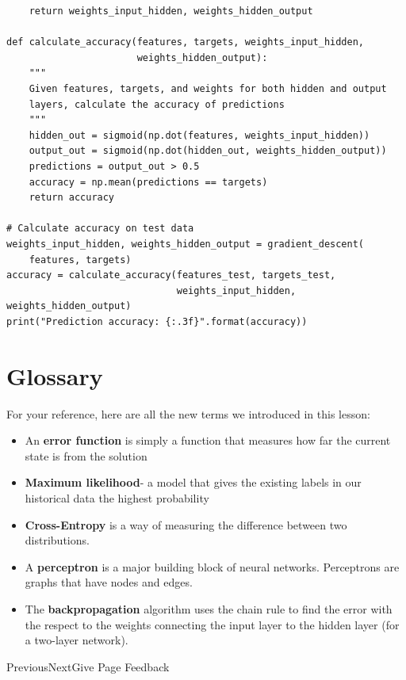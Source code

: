 \begin{lstlisting}
    return weights_input_hidden, weights_hidden_output

def calculate_accuracy(features, targets, weights_input_hidden,
                       weights_hidden_output):
    """
    Given features, targets, and weights for both hidden and output
    layers, calculate the accuracy of predictions
    """
    hidden_out = sigmoid(np.dot(features, weights_input_hidden))
    output_out = sigmoid(np.dot(hidden_out, weights_hidden_output))
    predictions = output_out > 0.5
    accuracy = np.mean(predictions == targets)
    return accuracy

# Calculate accuracy on test data
weights_input_hidden, weights_hidden_output = gradient_descent(
    features, targets)
accuracy = calculate_accuracy(features_test, targets_test,
                              weights_input_hidden, weights_hidden_output)
print("Prediction accuracy: {:.3f}".format(accuracy))
\end{lstlisting}

\section{Glossary}

For your reference, here are all the new terms we introduced in this lesson:

\begin{itemize}
    \item An \textbf{error function} is simply a function that measures how far the current state is from the solution
    \item \textbf{Maximum likelihood}- a model that gives the existing labels in our historical data the highest probability
    \item \textbf{Cross-Entropy} is a way of measuring the difference between two distributions.
    \item A \textbf{perceptron} is a major building block of neural networks. Perceptrons are graphs that have nodes and edges.
    \item The \textbf{backpropagation} algorithm uses the chain rule to find the error with the respect to the weights connecting the input layer to the hidden layer (for a two-layer network).
\end{itemize}
PreviousNextGive Page Feedback
